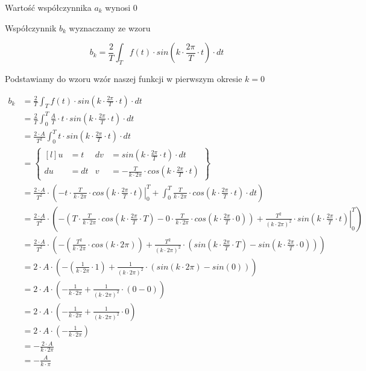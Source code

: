 \begin{task}
Wartość współczynnika $a_k$ wynosi $0$


Współczynnik $b_k$ wyznaczamy ze wzoru

\begin{equation}
b_k=\frac{2}{T}\int_{T}f(t) \cdot sin\left( k \cdot \frac{2\pi}{T} \cdot t\right) \cdot dt
\end{equation}

Podstawiamy do wzoru wzór naszej funkcji w pierwszym okresie $k=0$

\begin{equation}
\begin{aligned}
b_k&=\frac{2}{T}\int_{T}f(t) \cdot sin\left( k \cdot \frac{2\pi}{T} \cdot t\right) \cdot dt\\
&=\frac{2}{T}\int_{0}^{T}\frac{A}{T}\cdot t \cdot sin\left( k \cdot \frac{2\pi}{T} \cdot t\right) \cdot dt\\
&=\frac{2\cdot A}{T^2}\int_{0}^{T} t \cdot sin\left( k \cdot \frac{2\pi}{T} \cdot t\right) \cdot dt\\
&=\begin{Bmatrix*}[l]
u&=t & dv&=sin\left( k \cdot \frac{2\pi}{T} \cdot t\right) \cdot dt \\
du&=dt & v&=-\frac{T}{k\cdot 2\pi}\cdot cos\left( k \cdot \frac{2\pi}{T} \cdot t\right)
\end{Bmatrix*}\\
&=\frac{2\cdot A}{T^2}\cdot \left(- \left.t \cdot \frac{T}{k\cdot 2\pi}\cdot cos\left( k \cdot \frac{2\pi}{T} \cdot t\right)\right|_{0}^{T} + \int_{0}^{T} \frac{T}{k\cdot 2\pi}\cdot cos\left( k \cdot \frac{2\pi}{T} \cdot t\right) \cdot dt \right)\\
&=\frac{2\cdot A}{T^2}\cdot \left(- \left(T \cdot \frac{T}{k\cdot 2\pi}\cdot cos\left( k \cdot \frac{2\pi}{T} \cdot T\right) - 0 \cdot \frac{T}{k\cdot 2\pi}\cdot cos\left( k \cdot \frac{2\pi}{T} \cdot 0\right)\right) + \left. \frac{T^2}{\left(k\cdot 2\pi\right)^2}\cdot sin\left( k \cdot \frac{2\pi}{T} \cdot t\right) \right|_{0}^{T} \right)\\
&=\frac{2\cdot A}{T^2}\cdot \left(- \left(\frac{T^2}{k\cdot 2\pi}\cdot cos\left( k \cdot 2\pi\right) \right) + \frac{T^2}{\left(k\cdot 2\pi\right)^2}\cdot \left(sin\left( k \cdot \frac{2\pi}{T} \cdot T\right) - sin\left( k \cdot \frac{2\pi}{T} \cdot 0\right)\right) \right)\\
&=2\cdot A \cdot \left(- \left(\frac{1}{k\cdot 2\pi}\cdot 1 \right) + \frac{1}{\left(k\cdot 2\pi\right)^2}\cdot \left(sin\left( k \cdot 2\pi\right) - sin\left( 0\right)\right) \right)\\
&=2\cdot A \cdot \left(- \frac{1}{k\cdot 2\pi} + \frac{1}{\left(k\cdot 2\pi\right)^2}\cdot \left(0 - 0\right) \right)\\
&=2\cdot A \cdot \left(- \frac{1}{k\cdot 2\pi} + \frac{1}{\left(k\cdot 2\pi\right)^2}\cdot 0 \right)\\
&=2\cdot A \cdot \left(- \frac{1}{k\cdot 2\pi}\right)\\
&=-\frac{2 \cdot A}{k\cdot 2\pi}\\
&=-\frac{A}{k\cdot \pi}\\
\end{aligned}
\end{equation}


\end{task}
